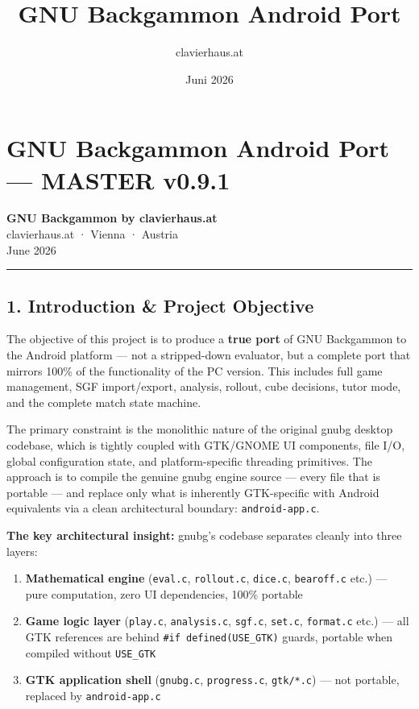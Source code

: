 \documentclass[11pt,a4paper]{article}
\title{\textbf{GNU Backgammon Android Port}}
\author{clavierhaus.at}
\date{Juni 2026}
\providecommand{\tightlist}{\setlength{\itemsep}{2pt}\setlength{\parskip}{0pt}}
\begin{document}
\maketitle\thispagestyle{fancy}

\tableofcontents\newpage

\section{GNU Backgammon Android Port --- MASTER v0.9.1}\label{gnu-backgammon-android-port-master-v09}

\textbf{GNU Backgammon by clavierhaus.at}\\
clavierhaus.at · Vienna · Austria\\
June 2026

\begin{center}\rule{0.5\linewidth}{0.5pt}\end{center}

\subsection{1. Introduction \& Project
Objective}\label{introduction-project-objective}

The objective of this project is to produce a \textbf{true port} of GNU
Backgammon to the Android platform --- not a stripped-down evaluator,
but a complete port that mirrors 100\% of the functionality of the PC
version. This includes full game management, SGF import/export,
analysis, rollout, cube decisions, tutor mode, and the complete match
state machine.

The primary constraint is the monolithic nature of the original gnubg
desktop codebase, which is tightly coupled with GTK/GNOME UI components,
file I/O, global configuration state, and platform-specific threading
primitives. The approach is to compile the genuine gnubg engine source
--- every file that is portable --- and replace only what is inherently
GTK-specific with Android equivalents via a clean architectural
boundary: \texttt{android-app.c}.

\textbf{The key architectural insight:} gnubg's codebase separates
cleanly into three layers:

\begin{enumerate}
\def\labelenumi{\arabic{enumi}.}
\tightlist
\item
  \textbf{Mathematical engine} (\texttt{eval.c}, \texttt{rollout.c},
  \texttt{dice.c}, \texttt{bearoff.c} etc.) --- pure computation, zero
  UI dependencies, 100\% portable
\item
  \textbf{Game logic layer} (\texttt{play.c}, \texttt{analysis.c},
  \texttt{sgf.c}, \texttt{set.c}, \texttt{format.c} etc.) --- all GTK
  references are behind \texttt{\#if\ defined(USE\_GTK)} guards,
  portable when compiled without \texttt{USE\_GTK}
\item
  \textbf{GTK application shell} (\texttt{gnubg.c}, \texttt{progress.c},
  \texttt{gtk/*.c}) --- not portable, replaced by \texttt{android-app.c}
\end{enumerate}
\end{document}
